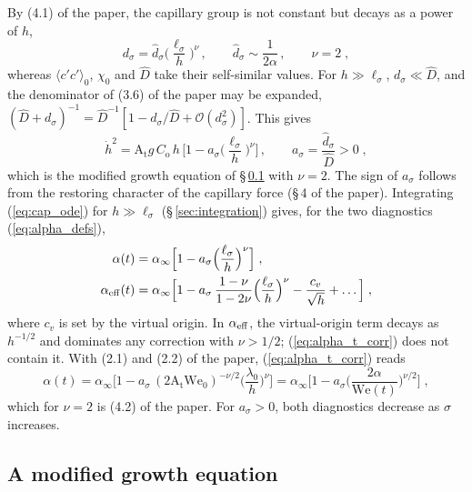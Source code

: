 \documentclass[11pt]{article}
\newcommand{\avg}[1]{\langle #1\rangle}
\newcommand{\At}{\mathrm{A_t}}
\newcommand{\We}{\mathrm{We}_0}
\newcommand{\lls}{\ell_\sigma}
\newcommand{\hd}{\dot h}
\begin{document}
By (4.1) of the paper, the capillary group is not constant but decays as a power of $h$,
\begin{equation}
  d_\sigma = \hat d_\sigma \Big(\frac{\lls}{h}\Big)^{\nu} \, , \qquad \hat d_\sigma \sim \frac{1}{2 \alpha} \, , \qquad \nu = 2 \;,
  \label{eq:dsigma_power}
\end{equation}
whereas $\avg{c' c'}_0$, $\chi_0$ and $\hat D$ take their self-similar values. For $h \gg \lls$, $d_\sigma \ll \hat D$, and the denominator of (3.6) of the paper may be expanded, $(\hat D + d_\sigma)^{-1} = \hat D^{-1} [1 - d_\sigma/\hat D + \mathcal O(d_\sigma^2)]$. This gives
\begin{equation}
  \hd^2 = \At g \, C_\mathrm{o} \, h \, \Big[1 - a_\sigma \Big(\frac{\lls}{h}\Big)^{\nu}\Big] \, , \qquad a_\sigma = \frac{\hat d_\sigma}{\hat D} > 0 \;,
  \label{eq:cap_ode}
\end{equation}
which is the modified growth equation of \S\,\ref{sec:modified} with $\nu = 2$. The sign of $a_\sigma$ follows from the restoring character of the capillary force (\S\,4 of the paper). Integrating (\ref{eq:cap_ode}) for $h \gg \lls$ (\S\,\ref{sec:integration}) gives, for the two diagnostics (\ref{eq:alpha_defs}),
\begin{align}
  \alpha(t) & = \alpha_\infty \Big[1 - a_\sigma \Big(\frac{\lls}{h}\Big)^{\nu}\Big] \;, \label{eq:alpha_t_corr} \\
  \alpha_{\rm eff}(t) & = \alpha_\infty \Big[1 - a_\sigma \, \frac{1 - \nu}{1 - 2 \nu} \Big(\frac{\lls}{h}\Big)^{\nu} - \frac{c_v}{\sqrt h} + \dots\Big] \;, \label{eq:alpha_eff_corr}
\end{align}
where $c_v$ is set by the virtual origin. In $\alpha_{\rm eff}$, the virtual-origin term decays as $h^{-1/2}$ and dominates any correction with $\nu > 1/2$; (\ref{eq:alpha_t_corr}) does not contain it. With (2.1) and (2.2) of the paper, (\ref{eq:alpha_t_corr}) reads
\begin{equation}
  \alpha(t) = \alpha_\infty \Big[1 - a_\sigma \,(2 \At \We)^{-\nu/2} \Big(\frac{\lambda_0}{h}\Big)^{\nu}\Big] = \alpha_\infty \Big[1 - a_\sigma \Big(\frac{2 \alpha}{\mathrm{We}(t)}\Big)^{\nu/2}\Big] \;,
  \label{eq:alpha_We_corr}
\end{equation}
which for $\nu = 2$ is (4.2) of the paper. For $a_\sigma > 0$, both diagnostics decrease as $\sigma$ increases.

\subsection{A modified growth equation}\label{sec:modified}
\end{document}
